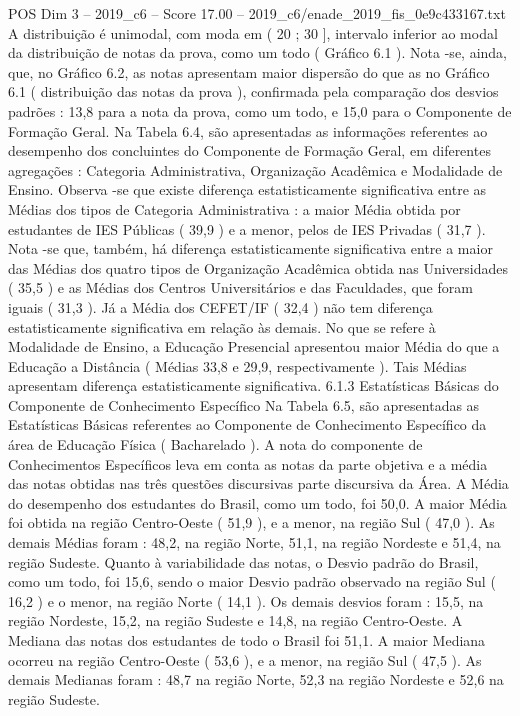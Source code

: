 \begin{textsample}{POS Dim 3 – 2019\_c6 – Score 17.00 – 2019\_c6/enade\_2019\_fis\_0e9c433167.txt}
A distribuição é unimodal, com moda em ( 20 ; 30 ], intervalo inferior ao modal da distribuição de notas da prova, como um todo ( Gráfico 6.1 ).
Nota -se, ainda, que, no Gráfico 6.2, as notas apresentam maior dispersão do que as no Gráfico 6.1 ( distribuição das notas da prova ), confirmada pela comparação dos desvios padrões : 13,8 para a nota da prova, como um todo, e 15,0 para o Componente de Formação Geral.
Na Tabela 6.4, são apresentadas as informações referentes ao desempenho dos concluintes do Componente de Formação Geral, em diferentes agregações : Categoria Administrativa, Organização Acadêmica e Modalidade de Ensino.
Observa -se que existe diferença estatisticamente significativa entre as Médias dos tipos de Categoria Administrativa : a maior Média obtida por estudantes de IES Públicas ( 39,9 ) e a menor, pelos de IES Privadas ( 31,7 ).
Nota -se que, também, há diferença estatisticamente significativa entre a maior das Médias dos quatro tipos de Organização Acadêmica obtida nas Universidades ( 35,5 ) e as Médias dos Centros Universitários e das Faculdades, que foram iguais ( 31,3 ).
Já a Média dos CEFET/IF ( 32,4 ) não tem diferença estatisticamente significativa em relação às demais.
No que se refere à Modalidade de Ensino, a Educação Presencial apresentou maior Média do que a Educação a Distância ( Médias 33,8 e 29,9, respectivamente ).
Tais Médias apresentam diferença estatisticamente significativa. 6.1.3 Estatísticas Básicas do Componente de Conhecimento Específico Na Tabela 6.5, são apresentadas as Estatísticas Básicas referentes ao Componente de Conhecimento Específico da área de Educação Física ( Bacharelado ).
A nota do componente de Conhecimentos Específicos leva em conta as notas da parte objetiva e a média das notas obtidas nas três questões discursivas parte discursiva da Área.
A Média do desempenho dos estudantes do Brasil, como um todo, foi 50,0.
A maior Média foi obtida na região Centro-Oeste ( 51,9 ), e a menor, na região Sul ( 47,0 ).
As demais Médias foram : 48,2, na região Norte, 51,1, na região Nordeste e 51,4, na região Sudeste.
Quanto à variabilidade das notas, o Desvio padrão do Brasil, como um todo, foi 15,6, sendo o maior Desvio padrão observado na região Sul ( 16,2 ) e o menor, na região Norte ( 14,1 ).
Os demais desvios foram : 15,5, na região Nordeste, 15,2, na região Sudeste e 14,8, na região Centro-Oeste.
A Mediana das notas dos estudantes de todo o Brasil foi 51,1.
A maior Mediana ocorreu na região Centro-Oeste ( 53,6 ), e a menor, na região Sul ( 47,5 ).
As demais Medianas foram : 48,7 na região Norte, 52,3 na região Nordeste e 52,6 na região Sudeste.

\end{textsample}

